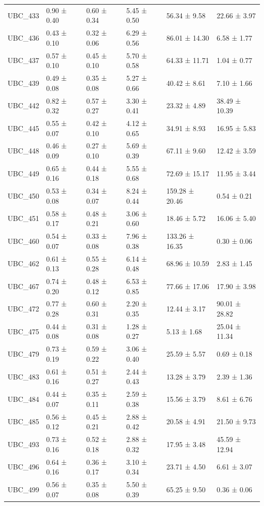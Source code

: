 \begin{tabular}{llllll}
UBC_433 & 0.90 ± 0.40 & 0.60 ± 0.34 & 5.45 ± 0.50 & 56.34 ± 9.58 & 22.66 ± 3.97 \\
UBC_436 & 0.43 ± 0.10 & 0.32 ± 0.06 & 6.29 ± 0.56 & 86.01 ± 14.30 & 6.58 ± 1.77 \\
UBC_437 & 0.57 ± 0.10 & 0.45 ± 0.10 & 5.70 ± 0.58 & 64.33 ± 11.71 & 1.04 ± 0.77 \\
UBC_439 & 0.49 ± 0.08 & 0.35 ± 0.08 & 5.27 ± 0.66 & 40.42 ± 8.61 & 7.10 ± 1.66 \\
UBC_442 & 0.82 ± 0.32 & 0.57 ± 0.27 & 3.30 ± 0.41 & 23.32 ± 4.89 & 38.49 ± 10.39 \\
UBC_445 & 0.55 ± 0.07 & 0.42 ± 0.10 & 4.12 ± 0.65 & 34.91 ± 8.93 & 16.95 ± 5.83 \\
UBC_448 & 0.46 ± 0.09 & 0.27 ± 0.10 & 5.69 ± 0.39 & 67.11 ± 9.60 & 12.42 ± 3.59 \\
UBC_449 & 0.65 ± 0.16 & 0.44 ± 0.18 & 5.55 ± 0.68 & 72.69 ± 15.17 & 11.95 ± 3.44 \\
UBC_450 & 0.53 ± 0.08 & 0.34 ± 0.07 & 8.24 ± 0.44 & 159.28 ± 20.46 & 0.54 ± 0.21 \\
UBC_451 & 0.58 ± 0.17 & 0.48 ± 0.21 & 3.06 ± 0.60 & 18.46 ± 5.72 & 16.06 ± 5.40 \\
UBC_460 & 0.54 ± 0.07 & 0.33 ± 0.08 & 7.96 ± 0.38 & 133.26 ± 16.35 & 0.30 ± 0.06 \\
UBC_462 & 0.61 ± 0.13 & 0.55 ± 0.28 & 6.14 ± 0.48 & 68.96 ± 10.59 & 2.83 ± 1.45 \\
UBC_467 & 0.74 ± 0.20 & 0.48 ± 0.12 & 6.53 ± 0.85 & 77.66 ± 17.06 & 17.90 ± 3.98 \\
UBC_472 & 0.77 ± 0.28 & 0.60 ± 0.31 & 2.20 ± 0.35 & 12.44 ± 3.17 & 90.01 ± 28.82 \\
UBC_475 & 0.44 ± 0.08 & 0.31 ± 0.08 & 1.28 ± 0.27 & 5.13 ± 1.68 & 25.04 ± 11.34 \\
UBC_479 & 0.73 ± 0.19 & 0.59 ± 0.22 & 3.06 ± 0.40 & 25.59 ± 5.57 & 0.69 ± 0.18 \\
UBC_483 & 0.61 ± 0.16 & 0.51 ± 0.27 & 2.44 ± 0.43 & 13.28 ± 3.79 & 2.39 ± 1.36 \\
UBC_484 & 0.44 ± 0.07 & 0.35 ± 0.11 & 2.59 ± 0.38 & 15.56 ± 3.79 & 8.61 ± 6.76 \\
UBC_485 & 0.56 ± 0.12 & 0.45 ± 0.21 & 2.88 ± 0.42 & 20.58 ± 4.91 & 21.50 ± 9.73 \\
UBC_493 & 0.73 ± 0.16 & 0.52 ± 0.18 & 2.88 ± 0.32 & 17.95 ± 3.48 & 45.59 ± 12.94 \\
UBC_496 & 0.64 ± 0.16 & 0.36 ± 0.17 & 3.10 ± 0.34 & 23.71 ± 4.50 & 6.61 ± 3.07 \\
UBC_499 & 0.56 ± 0.07 & 0.35 ± 0.08 & 5.50 ± 0.39 & 65.25 ± 9.50 & 0.36 ± 0.06 \\

\end{tabular}
